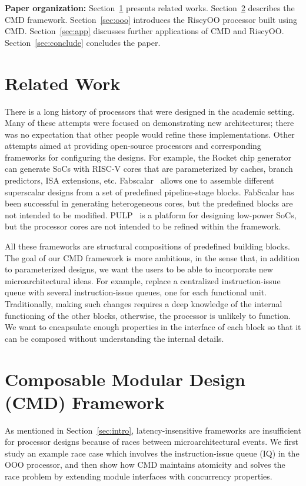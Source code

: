\documentclass[conference]{IEEEtran}
\begin{document}
\noindent\textbf{Paper organization:}
Section~\ref{sec:related} presents related works.
Section~\ref{sec:cmd} describes the CMD framework.
Section~\ref{sec:ooo} introduces the RiscyOO processor built using CMD.
Section~\ref{sec:app} discusses further applications of CMD and RiscyOO.
Section~\ref{sec:conclude} concludes the paper.

\section{Related Work}\label{sec:related}
There is a long history of processors that were designed in the academic setting.
Many of these attempts were focused on demonstrating new architectures; there was no expectation that other people would refine these implementations.
Other attempts aimed at providing open-source processors and corresponding frameworks for configuring the designs.
For example, the Rocket chip generator~\cite{rocketchip} can generate SoCs with RISC-V cores that are parameterized by caches, branch predictors, ISA extensions, etc.
Fabscalar~\cite{fabscalar} allows one to assemble different superscalar designs from a set of predefined pipeline-stage blocks.
FabScalar has been successful in generating heterogeneous cores, but the predefined blocks are not intended to be modified.
PULP~\cite{pulp} is a platform for designing low-power SoCs, but the processor cores are not intended to be refined within the framework.

All these frameworks are structural compositions of predefined building blocks.
The goal of our CMD framework is more ambitious, in the sense that, in addition to parameterized designs, we want the users to be able to incorporate new microarchitectural ideas.
For example, replace a centralized instruction-issue queue with several instruction-issue queues, one for each functional unit.
Traditionally, making such changes requires a deep knowledge of the internal functioning of the other blocks, otherwise, the processor is unlikely to function. 
We want to encapsulate enough properties in the interface of each block so that it can be composed without understanding the internal details.

\section{Composable Modular Design (CMD) Framework}\label{sec:cmd}

As mentioned in Section~\ref{sec:intro}, latency-insensitive frameworks are insufficient for processor designs because of races between microarchitectural events.
We first study an example race case which involves the instruction-issue queue (IQ) in the OOO processor, and then show how CMD maintains atomicity and solves the race problem by extending module interfaces with concurrency properties.
\end{document}
